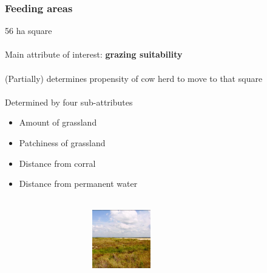 \documentclass{beamer}
\begin{document}
\begin{frame}
	\frametitle{Feeding areas}
	56 ha square \\~\\

	Main attribute of interest: \textbf{grazing suitability} \\~\\

	(Partially) determines propensity of cow herd to move to that square \\~\\

	Determined by four sub-attributes
	\begin{itemize}
		\item \small Amount of grassland
		\item \small Patchiness of grassland
		\item \small Distance from corral
		\item \small Distance from permanent water \\~\\
	\end{itemize}
	\begin{center}
		\includegraphics[height=1.0in, width=4in]{grassland.jpg}
	\end{center}
\end{frame}
\end{document}

